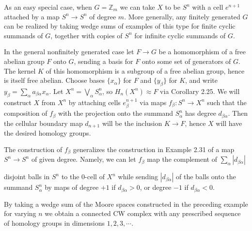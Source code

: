 As an easy special case, when $G = \mathbb{Z}_m$ we can take $X$ to be $S^n$ with a cell $e^{n+1}$ attached by a map $S^n \to S^n$ of degree $m$. More generally, any finitely generated $G$ can be realized by taking wedge sums of examples of this type for finite cyclic summands of $G$, together with copies of $S^n$ for infinite cyclic summands of $G$.

In the general nonfinitely generated case let $F \to G$ be a homomorphism of a free abelian group $F$ onto $G$, sending a basis for $F$ onto some set of generators of $G$. The kernel $K$ of this homomorphism is a subgroup of a free abelian group, hence is itself free abelian. Choose bases $\{x_\alpha\}$ for $F$ and $\{y_\beta\}$ for $K$, and write $y_\beta = \sum_\alpha a_{\beta\alpha} x_\alpha$. Let $X^n = \bigvee_\alpha S^n_\alpha$, so $H_n(X^n) \approx F$ via Corollary 2.25. We will construct $X$ from $X^n$ by attaching cells $e^{n+1}_\beta$ via maps $f_\beta: S^n \to X^n$ such that the composition of $f_\beta$ with the projection onto the summand $S^n_\alpha$ has degree $d_{\beta\alpha}$. Then the cellular boundary map $d_{n+1}$ will be the inclusion $K \to F$, hence $X$ will have the desired homology groups.

The construction of $f_\beta$ generalizes the construction in Example 2.31 of a map $S^n \to S^n$ of given degree. Namely, we can let $f_\beta$ map the complement of $\sum_\alpha |d_{\beta\alpha}|$

disjoint balls in $S^n$ to the 0-cell of $X^n$ while sending $|d_{\beta\alpha}|$ of the balls onto the summand $S^n_\alpha$ by maps of degree $+1$ if $d_{\beta\alpha} > 0$, or degree $-1$ if $d_{\beta\alpha} < 0$.

\begin{example}
\label{ex:cellular-homology-cpn}
By taking a wedge sum of the Moore spaces constructed in the preceding example for varying $n$ we obtain a connected CW complex with any prescribed sequence of homology groups in dimensions $1, 2, 3, \cdots$.
\end{example}

